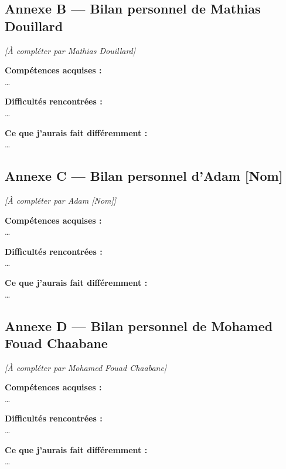 \documentclass[12pt,a4paper]{article}
\begin{document}
\subsection*{Annexe B --- Bilan personnel de Mathias Douillard}

\begin{tcolorbox}[colback=gray!5, colframe=gray!50, title=Bilan personnel]
  \textit{[À compléter par Mathias Douillard]}

  \medskip
  \textbf{Compétences acquises :} \\
  \ldots

  \medskip
  \textbf{Difficultés rencontrées :} \\
  \ldots

  \medskip
  \textbf{Ce que j'aurais fait différemment :} \\
  \ldots
\end{tcolorbox}

\subsection*{Annexe C --- Bilan personnel d'Adam [Nom]}

\begin{tcolorbox}[colback=gray!5, colframe=gray!50, title=Bilan personnel]
  \textit{[À compléter par Adam [Nom]]}

  \medskip
  \textbf{Compétences acquises :} \\
  \ldots

  \medskip
  \textbf{Difficultés rencontrées :} \\
  \ldots

  \medskip
  \textbf{Ce que j'aurais fait différemment :} \\
  \ldots
\end{tcolorbox}

\subsection*{Annexe D --- Bilan personnel de Mohamed Fouad Chaabane}

\begin{tcolorbox}[colback=gray!5, colframe=gray!50, title=Bilan personnel]
  \textit{[À compléter par Mohamed Fouad Chaabane]}

  \medskip
  \textbf{Compétences acquises :} \\
  \ldots

  \medskip
  \textbf{Difficultés rencontrées :} \\
  \ldots

  \medskip
  \textbf{Ce que j'aurais fait différemment :} \\
  \ldots
\end{tcolorbox}
\end{document}
